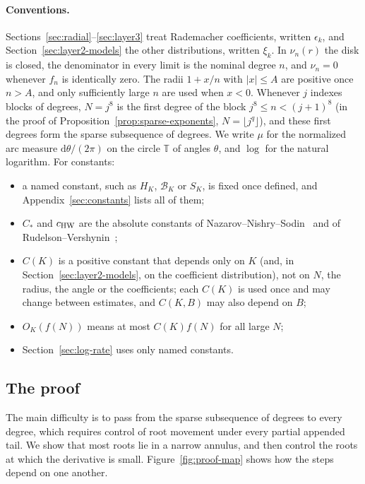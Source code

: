 \documentclass[12pt,leqno,twoside]{article}
\theoremstyle{named}
\theoremstyle{remark}
\begin{document}
\paragraph{Conventions.}
Sections~\ref{sec:radial}--\ref{sec:layer3} treat Rademacher
coefficients, written $\epsilon_k$, and Section~\ref{sec:layer2-models}
the other distributions, written $\xi_k$.
In $\nu_n(r)$ the disk is closed, the denominator in every limit is the
nominal degree $n$, and $\nu_n=0$ whenever $f_n$ is identically zero.
The radii $1+x/n$ with $|x|\le A$ are positive once $n>A$, and only
sufficiently large $n$ are used when $x<0$.
Whenever $j$ indexes blocks of degrees, $N=j^8$ is the first degree of the
block $j^8\le n<(j+1)^8$ (in the proof of
Proposition~\ref{prop:sparse-exponents}, $N=\lfloor j^q\rfloor$), and
these first degrees form the sparse subsequence of degrees.
We write $\mu$ for the normalized arc measure $\mathrm d\theta/(2\pi)$ on
the circle $\mathbb T$ of angles $\theta$, and $\log$ for the natural
logarithm. For constants:
\begin{itemize}
\item a named constant, such as $H_K$, $\mathcal B_K$ or $S_K$, is fixed once
defined, and Appendix~\ref{sec:constants} lists all of them;
\item $C_*$ and $c_{\rm HW}$ are the absolute constants of
Nazarov--Nishry--Sodin~\cite{NNS2013} and of
Rudelson--Vershynin~\cite{RudelsonVershynin2013};
\item $C(K)$ is a positive constant that depends only on $K$ (and, in
Section~\ref{sec:layer2-models}, on the coefficient distribution), not
on $N$, the radius, the angle or the coefficients; each $C(K)$ is used
once and may change between estimates, and $C(K,B)$ may also depend on
$B$;
\item $O_K(f(N))$ means at most $C(K)f(N)$ for all large $N$;
\item Section~\ref{sec:log-rate} uses only named constants.
\end{itemize}


\subsection*{The proof}
The main difficulty is to pass from the sparse subsequence of degrees to
every degree, which requires control of root movement under every partial
appended tail. We show that most roots lie in a narrow annulus, and then
control the roots at which the derivative is small.
Figure~\ref{fig:proof-map} shows how the steps depend on one another.
\end{document}
